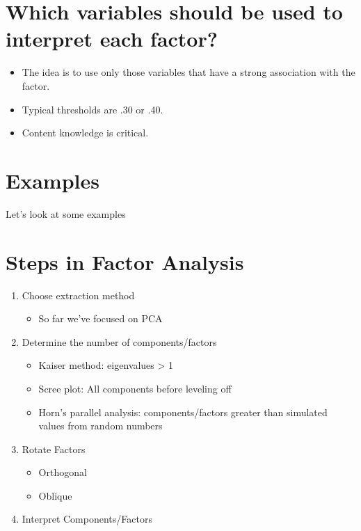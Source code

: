 \documentclass[
]{book}
\providecommand{\tightlist}{%
  \setlength{\itemsep}{0pt}\setlength{\parskip}{0pt}}
\begin{document}
\hypertarget{which-variables-should-be-used-to-interpret-each-factor}{%
\section{Which variables should be used to interpret each factor?}\label{which-variables-should-be-used-to-interpret-each-factor}}

\begin{itemize}
\tightlist
\item
  The idea is to use only those variables that have a strong association with the factor.
\item
  Typical thresholds are \textbar.30\textbar{} or \textbar.40\textbar.
\item
  Content knowledge is critical.
\end{itemize}

\hypertarget{examples}{%
\section{Examples}\label{examples}}

Let's look at some examples

\hypertarget{steps-in-factor-analysis}{%
\section{Steps in Factor Analysis}\label{steps-in-factor-analysis}}

\begin{enumerate}
\def\labelenumi{\arabic{enumi}.}
\tightlist
\item
  Choose extraction method

  \begin{itemize}
  \tightlist
  \item
    So far we've focused on PCA
  \end{itemize}
\item
  Determine the number of components/factors

  \begin{itemize}
  \tightlist
  \item
    Kaiser method: eigenvalues \textgreater{} 1
  \item
    Scree plot: All components before leveling off
  \item
    Horn's parallel analysis: components/factors greater than simulated values from random numbers
  \end{itemize}
\item
  Rotate Factors

  \begin{itemize}
  \tightlist
  \item
    Orthogonal
  \item
    Oblique
  \end{itemize}
\item
  Interpret Components/Factors
\end{enumerate}
\end{document}
